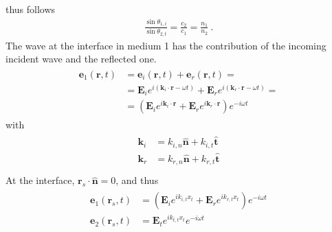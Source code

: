 \documentclass[letterpaper,10pt,english]{jupyterBook}
\begin{document}
\sphinxAtStartPar
thus  follows
\begin{equation*}
\begin{split}\frac{\sin \theta_{1,i}}{\sin \theta_{2,t}} = \frac{c_2}{c_1} = \frac{n_1}{n_2} \ .\end{split}
\end{equation*}
\sphinxAtStartPar
{} The wave at the interface in medium 1 has the contribution of the incoming incident wave and the reflected one.
\begin{equation*}
\begin{split}\begin{aligned}
\mathbf{e}_1(\mathbf{r},t)
& = \mathbf{e}_i(\mathbf{r},t) + \mathbf{e}_r(\mathbf{r},t) = \\
& = \mathbf{E}_{i} e^{i \left( \mathbf{k}_i \cdot \mathbf{r} - \omega t \right)} + \mathbf{E}_{r} e^{i \left( \mathbf{k}_r \cdot \mathbf{r} - \omega t \right)} = \\
& = \left( \mathbf{E}_{i} e^{i \mathbf{k}_i \cdot \mathbf{r}} + \mathbf{E}_{r} e^{i \mathbf{k}_r \cdot \mathbf{r} } \right) e^{-i \omega t}
\end{aligned}\end{split}
\end{equation*}
\sphinxAtStartPar
with
\begin{equation*}
\begin{split}\begin{aligned}
  \mathbf{k}_i & = k_{i,n} \hat{\mathbf{n}} + k_{i,t} \hat{\mathbf{t}} \\
  \mathbf{k}_r & = k_{r,n} \hat{\mathbf{n}} + k_{r,t} \hat{\mathbf{t}} \\
\end{aligned}\end{split}
\end{equation*}
\sphinxAtStartPar
At the interface, \(\mathbf{r}_s \cdot \hat{\mathbf{n}} = 0\), and thus
\begin{equation*}
\begin{split}\begin{aligned}
  \mathbf{e}_1(\mathbf{r}_s, t) & = \left( \mathbf{E}_i e^{i k_{i,t} x_t} + \mathbf{E}_r e^{i k_{r,t} x_t} \right) e^{-i\omega t} \\
  \mathbf{e}_2(\mathbf{r}_s, t) & =        \mathbf{E}_t e^{i k_{t,t} x_t} e^{-i \omega t} \\
\end{aligned}\end{split}
\end{equation*}
\end{document}
